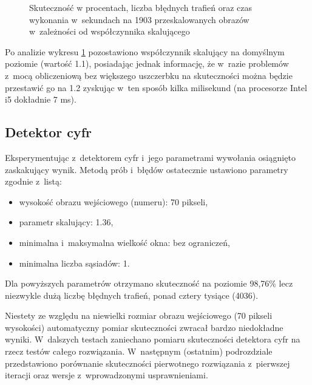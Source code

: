 \begin{figure}[h!]
\begin{center}
\end{center}
\caption{Skuteczność w procentach, liczba błędnych trafień
    oraz czas wykonania w~sekundach na 1903 przeskalowanych obrazów
w~zależności od współczynnika skalującego}
\label{chart:img_scale2hitratio}
\end{figure}

Po analizie wykresu \ref{chart:img_scale2hitratio}
pozostawiono współczynnik skalujący na 
domyślnym poziomie (wartość 1.1), posiadając
jednak informację, że w~razie problemów z~mocą obliczeniową
bez większego uszczerbku na skuteczności można będzie przestawić
go na 1.2 zyskując w~ten sposób kilka milisekund
(na procesorze Intel i5 dokładnie 7 ms).

\subsection{Detektor cyfr}

Eksperymentując z~detektorem cyfr i~jego parametrami wywołania
osiągnięto zaskakujący wynik. Metodą prób i~błędów ostatecznie
ustawiono parametry zgodnie z~listą:
\begin{itemize}
    \item wysokość obrazu wejściowego (numeru): 70 pikseli,
    \item parametr skalujący: 1.36,
    \item minimalna i~maksymalna wielkość okna: bez ograniczeń,
    \item minimalna liczba sąsiadów: 1.
\end{itemize}
Dla powyższych parametrów otrzymano skuteczność na poziomie 98,76\%
lecz niezwykle dużą liczbę błędnych trafień, ponad cztery tysiące
(4036).

Niestety ze względu na niewielki rozmiar obrazu wejściowego
(70 pikseli wysokości) automatyczny pomiar skuteczności
zwracał bardzo niedokładne wyniki. W~dalszych testach
zaniechano pomiaru skuteczności detektora cyfr na rzecz testów
całego rozwiązania. W~następnym (ostatnim) podrozdziale przedstawiono
porównanie skuteczności pierwotnego rozwiązania z~pierwszej iteracji
oraz wersje z~wprowadzonymi usprawnieniami.

